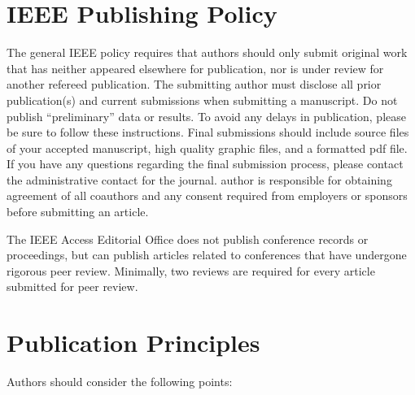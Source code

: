 \documentclass{ieeeaccess}
\begin{document}
\section{\break IEEE Publishing Policy}
The general IEEE policy requires that authors should only submit original work
that has neither appeared elsewhere for publication, nor is under review for
another refereed publication. The submitting author must disclose all prior
publication(s) and current submissions when submitting a manuscript. Do not
publish ``preliminary'' data or results. To avoid any delays in publication,
please be sure to follow these instructions. Final submissions should include
source files of your accepted manuscript, high quality graphic files, and a
formatted pdf file. If you have any questions regarding the final submission
process, please contact the administrative contact for the journal. author is
responsible for obtaining agreement of all coauthors and any consent required
from employers or sponsors before submitting an article.

The IEEE Access Editorial Office does not publish conference records or
proceedings, but can publish articles related to conferences that have
undergone rigorous peer review. Minimally, two reviews are required for every
article submitted for peer review.

\section{\break Publication Principles}
Authors should consider the following points:
\end{document}
